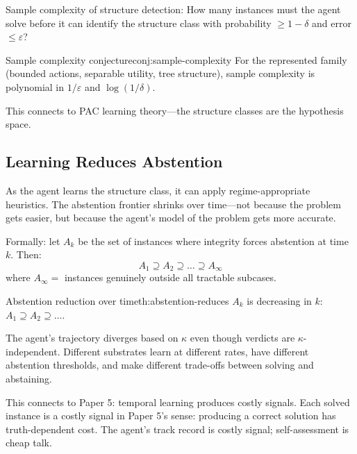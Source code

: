Sample complexity of structure detection:
How many instances must the agent solve before it can identify the structure class with probability $\geq 1 - \delta$ and error $\leq \varepsilon$?

\begin{claim}{Sample complexity conjecture}{conj:sample-complexity}
For the represented family (bounded actions, separable utility, tree structure), sample complexity is polynomial in $1/\varepsilon$ and $\log(1/\delta)$.
\end{claim}

This connects to PAC learning theory---the structure classes are the hypothesis space.

\subsection{Learning Reduces Abstention}

As the agent learns the structure class, it can apply regime-appropriate heuristics. The abstention frontier shrinks over time---not because the problem gets easier, but because the agent's model of the problem gets more accurate.

Formally: let $A_k$ be the set of instances where integrity forces abstention at time $k$. Then:
\[
A_1 \supseteq A_2 \supseteq \ldots \supseteq A_\infty
\]
where $A_\infty =$ instances genuinely outside all tractable subcases.

\begin{claim}{Abstention reduction over time}{th:abstention-reduces}
$A_k$ is decreasing in $k$: $A_1 \supseteq A_2 \supseteq \ldots$.
\end{claim}


The agent's trajectory diverges based on $\kappa$ even though verdicts are $\kappa$-independent. Different substrates learn at different rates, have different abstention thresholds, and make different trade-offs between solving and abstaining.

This connects to Paper 5: temporal learning produces costly signals. Each solved instance is a costly signal in Paper 5's sense: producing a correct solution has truth-dependent cost. The agent's track record is costly signal; self-assessment is cheap talk.
